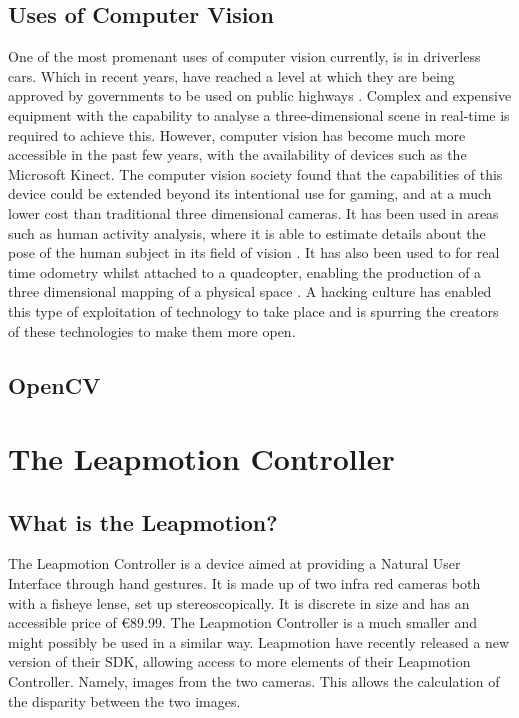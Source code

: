 \documentclass[12pt,a4paper]{report}
\begin{document}
			\subsection{Uses of Computer Vision}
				One of the most promenant uses of computer vision currently, is in driverless cars.
				Which in recent years, have reached a level at which they are being approved by governments to be used on public highways \cite{drivCars}.
				Complex and expensive equipment with the capability to analyse a three-dimensional scene in real-time is required to achieve this.
				However, computer vision has become much more accessible in the past few years, with the availability of devices such as the Microsoft Kinect.
				The computer vision society found that the capabilities of this device could be extended beyond its intentional use for gaming, and at a much lower cost than traditional three dimensional cameras.
				It has been used in areas such as human activity analysis, where it is able to estimate details about the pose of the human subject in its field of vision \cite{kinect:1}.
				It has also been used to for real time odometry whilst attached to a quadcopter, enabling the production of a three dimensional mapping of a physical space \cite{kinect:2}.
				A hacking culture has enabled this type of exploitation of technology to take place and is spurring the creators of these technologies to make them more open.
			\subsection{OpenCV}
			
		\section{The Leapmotion Controller}
			\subsection{What is the Leapmotion?}
				The Leapmotion Controller is a device aimed at providing a Natural User Interface through hand gestures.
				It is made up of two infra red cameras both with a fisheye lense, set up stereoscopically.
				It is discrete in size and has an accessible price of €89.99.
				The Leapmotion Controller is a much smaller and might possibly be used in a similar way.
				Leapmotion have recently released a new version of their SDK, allowing access to more elements of their Leapmotion Controller. 
				Namely, images from the two cameras.
				This allows the calculation of the disparity between the two images. %
\end{document}

